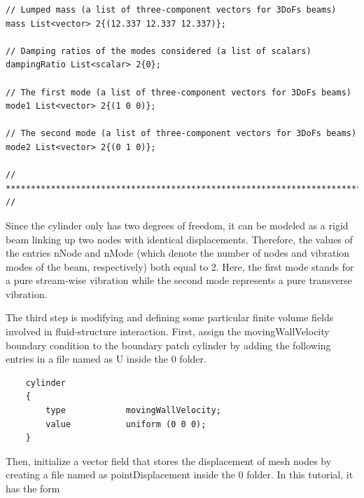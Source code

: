 \begin{lstlisting}
// Lumped mass (a list of three-component vectors for 3DoFs beams)
mass List<vector> 2{(12.337 12.337 12.337)};

// Damping ratios of the modes considered (a list of scalars)
dampingRatio List<scalar> 2{0};

// The first mode (a list of three-component vectors for 3DoFs beams)
mode1 List<vector> 2{(1 0 0)};

// The second mode (a list of three-component vectors for 3DoFs beams)
mode2 List<vector> 2{(0 1 0)};

// ************************************************************************* //
\end{lstlisting}

\noindent Since the cylinder only has two degrees of freedom, it can be modeled as a rigid beam linking up two nodes with identical displacements. Therefore, the values of the entries nNode and nMode (which denote the number of nodes and vibration modes of the beam, respectively) both equal to 2. Here, the first mode stands for a pure stream-wise vibration while the second mode represents a pure transverse vibration.

The third step is modifying and defining some particular finite volume fields involved in fluid-structure interaction. First, assign the movingWallVelocity boundary condition to the boundary patch cylinder by adding the following entries in a file named as U inside the 0 folder.

\begin{lstlisting}
    cylinder
    {
        type            movingWallVelocity;
        value           uniform (0 0 0);
    }
\end{lstlisting}

\noindent Then, initialize a vector field that stores the displacement of mesh nodes by creating a file named as pointDisplacement inside the 0 folder. In this tutorial, it has the form

